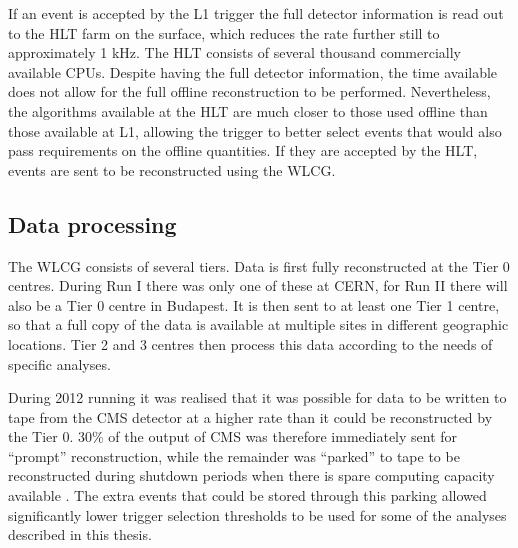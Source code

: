 If an event is accepted by the \ac{L1} trigger the full detector information is read out to the \ac{HLT} farm on the surface, which reduces the rate further still to approximately 1 kHz.  The \ac{HLT} consists of several thousand commercially available CPUs. Despite having the full detector information, the time available does not allow for the full offline reconstruction to be performed. Nevertheless, the algorithms available at the \ac{HLT} are much closer to those used offline than those available at \ac{L1}, allowing the trigger to better select events that would also pass requirements on the offline quantities. If they are accepted by the \ac{HLT}, events are sent to be reconstructed using the \ac{WLCG}. 

\subsection{Data processing}
The \ac{WLCG} consists of several tiers. Data is first fully reconstructed at the Tier 0 centres. During Run I there was only one of these at CERN, for Run II there will also be a Tier 0 centre in Budapest. It is then sent to at least one Tier 1 centre, so that a full copy of the data is available at multiple sites in different geographic locations. Tier 2 and 3 centres then process this data according to the needs of specific analyses.

During 2012 running it was realised that it was possible for data to be written to tape from the CMS detector at a higher rate than it could be reconstructed by the Tier 0. 30\% of the output of CMS was therefore immediately sent for ``prompt'' reconstruction, while the remainder was ``parked'' to tape to be reconstructed during \LHC shutdown periods when there is spare computing capacity available \cite{CMS-DP-2012-022}. The extra events that could be stored through this parking allowed significantly lower trigger selection thresholds to be used for some of the analyses described in this thesis.


